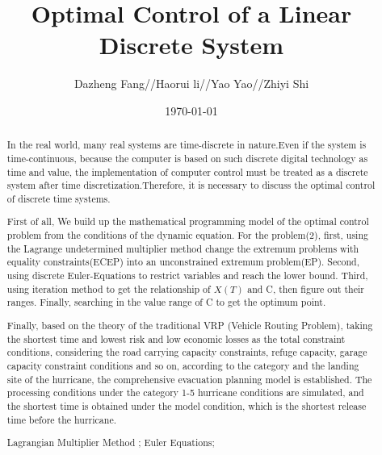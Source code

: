 \documentclass{mcmthesis}
\title{\large Optimal Control of a Linear Discrete System}
\author{Dazheng Fang//Haorui li//Yao Yao//Zhiyi Shi }
\date{\today}
\begin{document}
\begin{abstract}

In the real world, many real systems are time-discrete in nature.Even if the system is time-continuous, because the computer is based on such discrete digital technology as time and value, the implementation of computer control must be treated as a discrete system after time discretization.Therefore, it is necessary to discuss the optimal control of discrete time systems.

First of all, We build up the mathematical programming model of the optimal control problem from the conditions of the dynamic equation.
For the problem(2), first,  using the Lagrange undetermined multiplier method change the extremum problems with equality constraints(ECEP) into an unconstrained extremum problem(EP). Second, using discrete Euler-Equations to restrict variables and reach the lower bound. Third, using iteration method to get the relationship of $X(T)$ and C, then figure out their  ranges. Finally, searching in the value range of C to get the optimum point.%



Finally, based on the theory of the traditional VRP (Vehicle Routing Problem), taking the shortest time and lowest risk and low economic losses as the total constraint conditions, considering the road carrying capacity constraints, refuge capacity, garage capacity constraint conditions and so on, according to the category and the landing site of the hurricane, the comprehensive evacuation planning model is established. The processing conditions under the category 1-5 hurricane conditions are simulated, and the shortest time is obtained under the model condition, which is the shortest release time before the hurricane.

\begin{keywords}
Lagrangian Multiplier Method ; Euler Equations; 
\end{keywords}
\end{abstract}
\maketitle
\newpage                                                          %
\begin{adjustwidth}{-1cm}{0cm}

\setcounter{tocdepth}{3}
\thispagestyle{empty}
\tableofcontents                                                  %

\end{adjustwidth}
\end{document}
